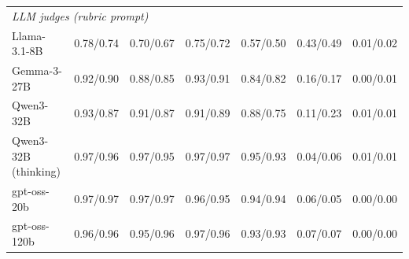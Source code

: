 \begin{tabular}{lcccccc}
\multicolumn{7}{l}{\textit{LLM judges (rubric prompt)}} \\
Llama-3.1-8B & 0.78/0.74 & 0.70/0.67 & 0.75/0.72 & 0.57/0.50 & 0.43/0.49 & 0.01/0.02 \\
Gemma-3-27B & 0.92/0.90 & 0.88/0.85 & 0.93/0.91 & 0.84/0.82 & 0.16/0.17 & 0.00/0.01 \\
Qwen3-32B & 0.93/0.87 & 0.91/0.87 & 0.91/0.89 & 0.88/0.75 & 0.11/0.23 & 0.01/0.01 \\
Qwen3-32B (thinking) & 0.97/0.96 & 0.97/0.95 & 0.97/0.97 & 0.95/0.93 & 0.04/0.06 & 0.01/0.01 \\
gpt-oss-20b & 0.97/0.97 & 0.97/0.97 & 0.96/0.95 & 0.94/0.94 & 0.06/0.05 & 0.00/0.00 \\
gpt-oss-120b & 0.96/0.96 & 0.95/0.96 & 0.97/0.96 & 0.93/0.93 & 0.07/0.07 & 0.00/0.00 \\
\bottomrule
\end{tabular}